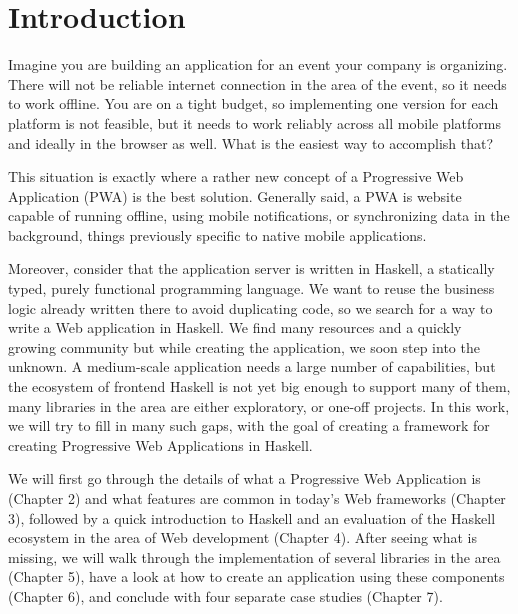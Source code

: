 \documentclass[english,odsaz]{fitthesis}
\date{\today}
\title{}
\begin{document}
\maketitle
\setlength{\parskip}{0pt}
{\hypersetup{hidelinks}\tableofcontents}
\iftotalfigures\listoffigures\fi
\iftotaltables\listoftables\fi
\iftotallistings\listoflistings\fi
\iftwoside\cleardoublepage\fi
\setlength{\parskip}{0.5\bigskipamount}

\chapter{Introduction}
\label{sec:org967c478}
Imagine you are building an application for an event your company is
organizing. There will not be reliable internet connection in the area of the
event, so it needs to work offline. You are on a tight budget, so implementing
one version for each platform is not feasible, but it needs to work reliably
across all mobile platforms and ideally in the browser as well. What is the
easiest way to accomplish that?

This situation is exactly where a rather new concept of a Progressive Web
Application (PWA) is the best solution. Generally said, a PWA is website
capable of running offline, using mobile notifications, or synchronizing data in
the background, things previously specific to native mobile applications.

Moreover, consider that the application server is written in Haskell, a
statically typed, purely functional programming language. We want to reuse the
business logic already written there to avoid duplicating code, so we search for
a way to write a Web application in Haskell. We find many resources and a
quickly growing community but while creating the application, we soon step into
the unknown. A medium-scale application needs a large number of capabilities,
but the ecosystem of frontend Haskell is not yet big enough to support many of
them, many libraries in the area are either exploratory, or one-off projects.
In this work, we will try to fill in many such gaps, with the goal of creating a
framework for creating Progressive Web Applications in Haskell.

We will first go through the details of what a Progressive Web Application is
(Chapter 2) and what features are common in today's Web frameworks (Chapter 3),
followed by a quick introduction to Haskell and an evaluation of the Haskell
ecosystem in the area of Web development (Chapter 4). After seeing what is
missing, we will walk through the implementation of several libraries in the
area (Chapter 5), have a look at how to create an application using these
components (Chapter 6), and conclude with four separate case studies (Chapter
7).
\end{document}
